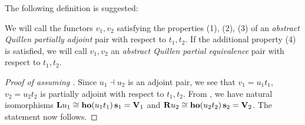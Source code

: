 The following definition is suggested:
\begin{defn}
\label{defn:abstractQuillenadjoint2}
We will call the functors $v_1, v_2$ satisfying the properties (1), (2), (3) of  an {\it abstract Quillen partially adjoint} pair with respect to $t_1, t_2$. If the additional property (4) is satisfied, we will call $v_1, v_2$ an {\it abstract Quillen partial equivalence} pair with respect to $t_1, t_2$.
\end{defn}


\begin{proof}[Proof of  assuming ]
Since $u_1 \dashv u_2$ is an adjoint pair, we see that $v_1 = u_1t_1$, $v_2 = u_2t_2$ is partially adjoint with respect to $t_1, t_2$. From , we have natural isomorphisms ${\bf L}u_1 \cong {\bf ho}(u_1t_1) \, {\bf s}_1 = {\bf V}_1$ and ${\bf R}u_2 \cong {\bf ho}(u_2t_2) \, {\bf s}_2 = {\bf V}_2$. The statement now follows.
\end{proof}

